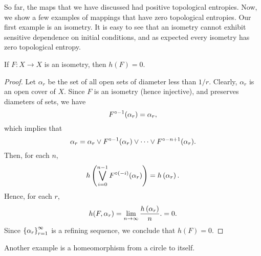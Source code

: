\documentclass[12pt,twoside,draft]{book}
\begin{document}
  So far, the maps that we have discussed had positive topological entropies.
  Now, we show a few examples of mappings that have zero topological entropies.
  Our first example is an isometry.
  It is easy to see that an isometry cannot exhibit sensitive dependence on initial conditions, and as expected every isometry has zero topological entropy.
  \begin{proposition}
    \citep{akm}
    If $F: X \to X$ is an isometry, then $h(F) = 0$.
    \begin{proof}
      Let $\alpha_r$ be the set of all open sets of diameter less than $1/r$.
      Clearly, $\alpha_r$ is an open cover of $X$.
      Since $F$ is an isometry (hence injective), and preserves diameters of sets, we have
      \begin{equation*}
        F^{\circ -1}(\alpha_r) = \alpha_r,
      \end{equation*}
      which implies that
      \begin{equation*}
        \alpha_r = \alpha_r \vee F^{\circ -1}(\alpha_r) \vee \cdots \vee F^{\circ -n+1}(\alpha_r).
      \end{equation*}
      Then, for each $n$,
      \begin{equation*}
        h\left (  \bigvee\limits_{i=0}^{n-1} F^{\circ (-i)}(\alpha_r)  \right )   
        = h\left ( \alpha_r \right ).
      \end{equation*}
      Hence, for each $r$,
      \begin{equation*}
        h(F, \alpha_r)
        = \lim\limits_{n \to \infty} \frac{h\left ( \alpha_r \right )}{n}.
        = 0.
      \end{equation*}
      Since $\left \{ \alpha_r \right \}^{\infty}_{r = 1}$ is a refining sequence, we conclude that $h(F) = 0$.
    \end{proof}
  \end{proposition}
  Another example is a homeomorphism from a circle to itself.
\end{document}
